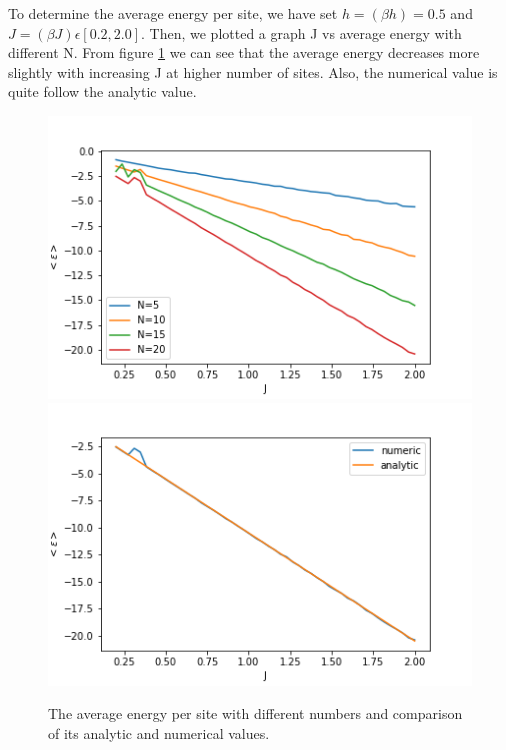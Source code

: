 \documentclass[11pt, a4paper, DIV=12]{scrartcl}
\begin{document}
To determine the average energy per site, we have set $ h=(\beta h)= 0.5 $ and $ J=(\beta J) \epsilon[0.2, 2.0] $. Then, we plotted a graph J vs average energy with different N. From figure \ref{fig:AEnergy} we can see that the average energy decreases more slightly with increasing J at higher number of sites. Also, the numerical value is quite follow the analytic value.
\begin{figure}[H]
	\centering
	\includegraphics[width=0.6\linewidth]{energy.png}\includegraphics[width=0.6\linewidth]{energy_comparison.png}
	\caption{The average energy per site with different numbers and comparison of its analytic and numerical values.}
	\label{fig:AEnergy}
\end{figure}
\end{document}
